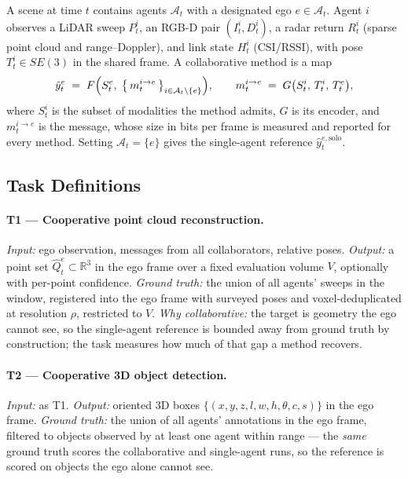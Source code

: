 A scene at time $t$ contains agents $\mathcal{A}_t$ with a designated ego
$e \in \mathcal{A}_t$. Agent $i$ observes a LiDAR sweep $P^i_t$, an RGB-D pair
$(I^i_t, D^i_t)$, a radar return $R^i_t$ (sparse point cloud and
range--Doppler), and link state $H^i_t$ (CSI/RSSI), with pose
$T^i_t \in SE(3)$ in the shared frame. A collaborative method is a map
\begin{equation}
  \hat{y}^e_t \;=\; F\Bigl(S^e_t,\; \bigl\{\,m^{i \to e}_t \,\bigr\}_{i \in \mathcal{A}_t \setminus \{e\}}\Bigr),
  \qquad
  m^{i \to e}_t \;=\; G\bigl(S^i_t,\, T^i_t,\, T^e_t\bigr),
\end{equation}
where $S^i_t$ is the subset of modalities the method admits, $G$ is its
encoder, and $m^{i \to e}_t$ is the message, whose size in bits per frame is
measured and reported for every method. Setting $\mathcal{A}_t = \{e\}$ gives
the single-agent reference $\hat{y}^{e,\mathrm{solo}}_t$.

\subsection{Task Definitions}
\label{sec:bench:tasks}

\paragraph{T1 --- Cooperative point cloud reconstruction.}
\emph{Input:} ego observation, messages from all collaborators, relative poses.
\emph{Output:} a point set $\hat{Q}^e_t \subset \mathbb{R}^3$ in the ego frame
over a fixed evaluation volume $V$, optionally with per-point confidence.
\emph{Ground truth:} the union of all agents' sweeps in the window, registered
into the ego frame with surveyed poses and voxel-deduplicated at resolution
$\rho$, restricted to $V$. \emph{Why collaborative:} the target is geometry the
ego cannot see, so the single-agent reference is bounded away from ground truth
by construction; the task measures how much of that gap a method recovers.

\paragraph{T2 --- Cooperative 3D object detection.}
\emph{Input:} as T1. \emph{Output:} oriented 3D boxes
$\{(x,y,z,l,w,h,\theta,c,s)\}$ in the ego frame. \emph{Ground truth:} the union
of all agents' annotations in the ego frame, filtered to objects observed by at
least one agent within range --- the \emph{same} ground truth scores the
collaborative and single-agent runs, so the reference is scored on objects the
ego alone cannot see.

